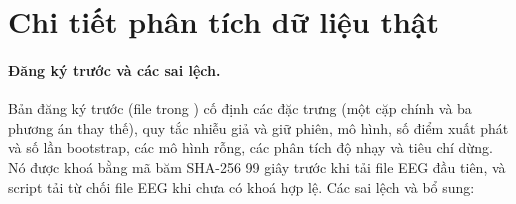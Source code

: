 \section{Chi tiết phân tích dữ liệu thật}
\label{app:realdata}

\paragraph{Đăng ký trước và các sai lệch.} Bản đăng ký trước (file  trong ) cố định các đặc trưng (một cặp chính và ba phương án thay thế), quy tắc nhiễu giả và giữ phiên, mô hình, số điểm xuất phát và số lần bootstrap, các mô hình rỗng, các phân tích độ nhạy và tiêu chí dừng. Nó được khoá bằng mã băm SHA-256 99 giây trước khi tải file EEG đầu tiên, và script tải từ chối file EEG khi chưa có khoá hợp lệ. Các sai lệch và bổ sung:

